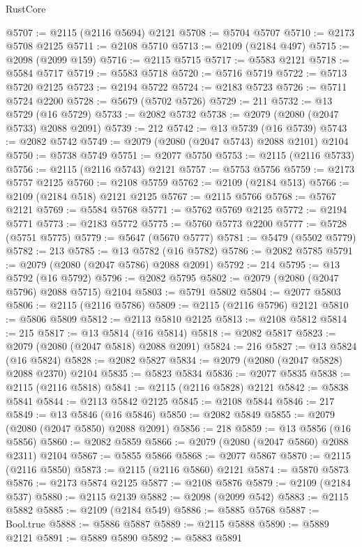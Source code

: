\begin{lexlean}{RustCore}
\begin{coremodule}
@5707 := @2115 (@2116 @5694) @2121
@5708 := @5704 @5707
@5710 := @2173 @5708 @2125
@5711 := @2108 @5710
@5713 := @2109 (@2184 @497)
@5715 := @2098 (@2099 @159)
@5716 := @2115 @5715
@5717 := @5583 @2121
@5718 := @5584 @5717
@5719 := @5583 @5718
@5720 := @5716 @5719
@5722 := @5713 @5720 @2125
@5723 := @2194 @5722
@5724 := @2183 @5723
@5726 := @5711 @5724 @2200
@5728 := @5679 (@5702 @5726)
@5729 := 211
@5732 := @13 @5729 (@16 @5729)
@5733 := @2082 @5732
@5738 := @2079 (@2080 (@2047 @5733) @2088 @2091)
@5739 := 212
@5742 := @13 @5739 (@16 @5739)
@5743 := @2082 @5742
@5749 := @2079 (@2080 (@2047 @5743) @2088 @2101) @2104
@5750 := @5738 @5749
@5751 := @2077 @5750
@5753 := @2115 (@2116 @5733)
@5756 := @2115 (@2116 @5743) @2121
@5757 := @5753 @5756
@5759 := @2173 @5757 @2125
@5760 := @2108 @5759
@5762 := @2109 (@2184 @513)
@5766 := @2109 (@2184 @518) @2121 @2125
@5767 := @2115 @5766
@5768 := @5767 @2121
@5769 := @5584 @5768
@5771 := @5762 @5769 @2125
@5772 := @2194 @5771
@5773 := @2183 @5772
@5775 := @5760 @5773 @2200
@5777 := @5728 (@5751 @5775)
@5779 := @5647 (@5670 @5777)
@5781 := @5479 (@5502 @5779)
@5782 := 213
@5785 := @13 @5782 (@16 @5782)
@5786 := @2082 @5785
@5791 := @2079 (@2080 (@2047 @5786) @2088 @2091)
@5792 := 214
@5795 := @13 @5792 (@16 @5792)
@5796 := @2082 @5795
@5802 := @2079 (@2080 (@2047 @5796) @2088 @5715) @2104
@5803 := @5791 @5802
@5804 := @2077 @5803
@5806 := @2115 (@2116 @5786)
@5809 := @2115 (@2116 @5796) @2121
@5810 := @5806 @5809
@5812 := @2113 @5810 @2125
@5813 := @2108 @5812
@5814 := 215
@5817 := @13 @5814 (@16 @5814)
@5818 := @2082 @5817
@5823 := @2079 (@2080 (@2047 @5818) @2088 @2091)
@5824 := 216
@5827 := @13 @5824 (@16 @5824)
@5828 := @2082 @5827
@5834 := @2079 (@2080 (@2047 @5828) @2088 @2370) @2104
@5835 := @5823 @5834
@5836 := @2077 @5835
@5838 := @2115 (@2116 @5818)
@5841 := @2115 (@2116 @5828) @2121
@5842 := @5838 @5841
@5844 := @2113 @5842 @2125
@5845 := @2108 @5844
@5846 := 217
@5849 := @13 @5846 (@16 @5846)
@5850 := @2082 @5849
@5855 := @2079 (@2080 (@2047 @5850) @2088 @2091)
@5856 := 218
@5859 := @13 @5856 (@16 @5856)
@5860 := @2082 @5859
@5866 := @2079 (@2080 (@2047 @5860) @2088 @2311) @2104
@5867 := @5855 @5866
@5868 := @2077 @5867
@5870 := @2115 (@2116 @5850)
@5873 := @2115 (@2116 @5860) @2121
@5874 := @5870 @5873
@5876 := @2173 @5874 @2125
@5877 := @2108 @5876
@5879 := @2109 (@2184 @537)
@5880 := @2115 @2139
@5882 := @2098 (@2099 @542)
@5883 := @2115 @5882
@5885 := @2109 (@2184 @549)
@5886 := @5885 @5768
@5887 := Bool.true
@5888 := @5886 @5887
@5889 := @2115 @5888
@5890 := @5889 @2121
@5891 := @5889 @5890
@5892 := @5883 @5891

\end{coremodule}
\end{lexlean}
